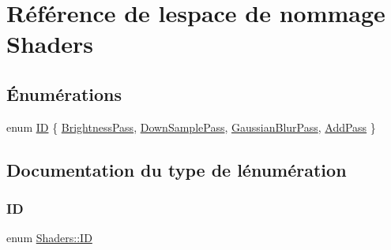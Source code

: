 \hypertarget{namespace_shaders}{}\section{Référence de l\textquotesingle{}espace de nommage Shaders}
\label{namespace_shaders}
\subsection*{Énumérations}
\begin{DoxyCompactItemize}
\item 
enum \hyperlink{namespace_shaders_ac69c86b4e324fdda75990b34e9a1dc7e}{ID} \{ \hyperlink{namespace_shaders_ac69c86b4e324fdda75990b34e9a1dc7ea6cf12444f0c4d15c72b6a047369f9a8d}{Brightness\+Pass}, 
\hyperlink{namespace_shaders_ac69c86b4e324fdda75990b34e9a1dc7ea3af3be001f0b1f0197ca8b92cd30dc1e}{Down\+Sample\+Pass}, 
\hyperlink{namespace_shaders_ac69c86b4e324fdda75990b34e9a1dc7ea69b96ae49a480c5196716d2a9adefca6}{Gaussian\+Blur\+Pass}, 
\hyperlink{namespace_shaders_ac69c86b4e324fdda75990b34e9a1dc7ea38c56faf4f826a549c813b20aaf9bb35}{Add\+Pass}
 \}
\end{DoxyCompactItemize}


\subsection{Documentation du type de l\textquotesingle{}énumération}
\hypertarget{namespace_shaders_ac69c86b4e324fdda75990b34e9a1dc7e}{}\label{namespace_shaders_ac69c86b4e324fdda75990b34e9a1dc7e} 
\subsubsection{\texorpdfstring{ID}{ID}}
{\footnotesize\ttfamily enum \hyperlink{namespace_shaders_ac69c86b4e324fdda75990b34e9a1dc7e}{Shaders\+::\+ID}}

